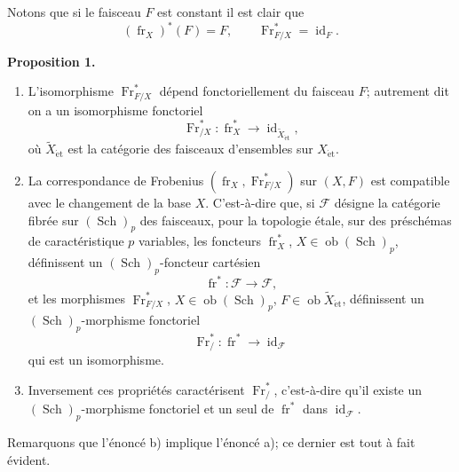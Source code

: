 \documentclass[11pt]{article}
\newenvironment{statement}[1]{\par\medskip\noindent\textbf{#1.}\ }{\par\medskip}
\providecommand{\et}{\mathrm{\acute{e}t}}
\providecommand{\id}{\operatorname{id}}
\providecommand{\Ob}{\operatorname{ob}}
\providecommand{\id}{\operatorname{id}}
\providecommand{\id}{\operatorname{id}}
\providecommand{\Ob}{\operatorname{ob}}
\providecommand{\id}{\operatorname{id}}
\providecommand{\id}{\operatorname{id}}
\providecommand{\Ob}{\operatorname{Ob}}
\providecommand{\Ob}{\operatorname{ob}}
\providecommand{\fr}{\operatorname{fr}}
\providecommand{\Fr}{\operatorname{Fr}}
\providecommand{\Sch}{\operatorname{Sch}}
\providecommand{\Fr}{\operatorname{Fr}}
\providecommand{\fr}{\operatorname{fr}}
\providecommand{\Sch}{\operatorname{Sch}}
\providecommand{\id}{\operatorname{id}}
\providecommand{\Ob}{\operatorname{Ob}}
\providecommand{\et}{\acute{e}t}
\begin{document}
Notons que si le faisceau $F$ est constant il est clair que
\[
(\fr_X)^*(F)=F,
\qquad
\Fr^*_{F/X}=\id_F.
\]

\begin{statement}{Proposition 1}
\begin{enumerate}[label=\alph*)]
\item L'isomorphisme $\Fr^*_{F/X}$ dépend fonctoriellement du faisceau $F$; autrement dit on a un isomorphisme fonctoriel
\[
\Fr^*_{/X}:\fr_X^*\longrightarrow \id_{\widetilde X_{\et}},
\]
où $\widetilde X_{\et}$ est la catégorie des faisceaux d'ensembles sur $X_{\et}$.
\item La correspondance de Frobenius $(\fr_X,\Fr^*_{F/X})$ sur $(X,F)$ est compatible avec le changement de la base $X$. C'est-à-dire que, si $\mathcal F$ désigne la catégorie fibrée sur $(\Sch)_p$ des faisceaux, pour la topologie étale, sur des préschémas de caractéristique $p$ variables, les foncteurs $\fr_X^*$, $X\in\Ob(\Sch)_p$, définissent un $(\Sch)_p$-foncteur cartésien
\[
\fr^*: \mathcal F\longrightarrow\mathcal F,
\]
et les morphismes $\Fr^*_{F/X}$, $X\in\Ob(\Sch)_p$, $F\in\Ob\widetilde X_{\et}$, définissent un $(\Sch)_p$-morphisme fonctoriel
\[
\Fr^*_{/}:\fr^*\longrightarrow\id_{\mathcal F}
\]
qui est un isomorphisme.
\item Inversement ces propriétés caractérisent $\Fr^*_{/}$, c'est-à-dire qu'il existe un $(\Sch)_p$-morphisme fonctoriel et un seul de $\fr^*$ dans $\id_{\mathcal F}$.
\end{enumerate}
\end{statement}

Remarquons que l'énoncé b) implique l'énoncé a); ce dernier est tout à fait évident.
\end{document}

